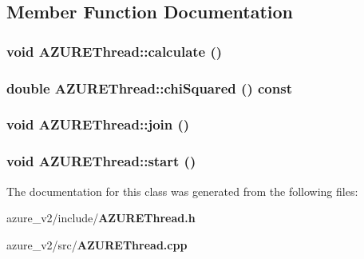 \subsection{Member Function Documentation}
\subsubsection{\setlength{\rightskip}{0pt plus 5cm}void AZUREThread::calculate ()}\label{classAZUREThread_70439040e25822bb151e993d11a62547}


\subsubsection{\setlength{\rightskip}{0pt plus 5cm}double AZUREThread::chi\-Squared () const\hspace{0.3cm}{\tt  [inline]}}\label{classAZUREThread_601a4832b1a6b817996cf7204cf3be3b}


\subsubsection{\setlength{\rightskip}{0pt plus 5cm}void AZUREThread::join ()}\label{classAZUREThread_3da100cd75f61fe3391637c57de373f8}


\subsubsection{\setlength{\rightskip}{0pt plus 5cm}void AZUREThread::start ()}\label{classAZUREThread_0514506f09737860743693c011439585}




The documentation for this class was generated from the following files:\begin{CompactItemize}
\item 
azure\_\-v2/include/\bf{AZUREThread.h}\item 
azure\_\-v2/src/\bf{AZUREThread.cpp}\end{CompactItemize}
